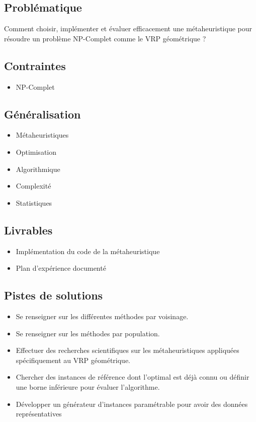 \subsection*{Problématique}
{}
\noindent Comment choisir, implémenter et évaluer efficacement une métaheuristique pour résoudre un problème NP-Complet comme le VRP géométrique ?

\subsection*{Contraintes}
{}
\begin{itemize}
	\item NP-Complet
\end{itemize}

\subsection*{Généralisation}
{}
\begin{itemize}
	\item Métaheuristiques
	\item Optimisation
	\item Algorithmique
	\item Complexité
	\item Statistiques
\end{itemize}

\subsection*{Livrables}
{}
\begin{itemize}
	\item Implémentation du code de la métaheuristique
	\item Plan d'expérience documenté
\end{itemize}

\subsection*{Pistes de solutions}
{}
\begin{itemize}
	\item Se renseigner sur les différentes méthodes par voisinage.
	\item Se renseigner sur les méthodes par population.
	\item Effectuer des recherches scientifiques sur les métaheuristiques appliquées spécifiquement au VRP géométrique.
	\item Chercher des instances de référence dont l'optimal est déjà connu ou définir une borne inférieure pour évaluer l'algorithme.
	\item Développer un générateur d'instances paramétrable pour avoir des données représentatives
\end{itemize}

